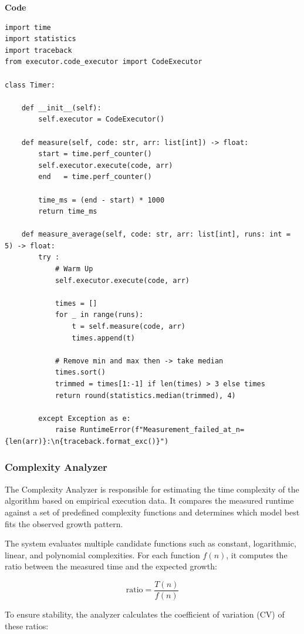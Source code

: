 \documentclass[12pt]{article}
\begin{document}
\vspace{1cm}
\textbf{Code}

\begin{lstlisting}
import time
import statistics
import traceback
from executor.code_executor import CodeExecutor

class Timer:

    def __init__(self):
        self.executor = CodeExecutor()

    def measure(self, code: str, arr: list[int]) -> float:        
        start = time.perf_counter()
        self.executor.execute(code, arr)
        end   = time.perf_counter()

        time_ms = (end - start) * 1000
        return time_ms

    def measure_average(self, code: str, arr: list[int], runs: int = 5) -> float:
        try :
            # Warm Up 
            self.executor.execute(code, arr)

            times = []
            for _ in range(runs):
                t = self.measure(code, arr)
                times.append(t)

            # Remove min and max then -> take median
            times.sort()
            trimmed = times[1:-1] if len(times) > 3 else times
            return round(statistics.median(trimmed), 4)

        except Exception as e:
            raise RuntimeError(f"Measurement_failed_at_n={len(arr)}:\n{traceback.format_exc()}")
\end{lstlisting}

\newpage
\subsubsection{Complexity Analyzer}

The Complexity Analyzer is responsible for estimating the time complexity of the algorithm based on empirical execution data. It compares the measured runtime against a set of predefined complexity functions and determines which model best fits the observed growth pattern.

The system evaluates multiple candidate functions such as constant, logarithmic, linear, and polynomial complexities. For each function $f(n)$, it computes the ratio between the measured time and the expected growth:

$$
\text{ratio} = \frac{T(n)}{f(n)}
$$

To ensure stability, the analyzer calculates the coefficient of variation (CV) of these ratios:
\end{document}
